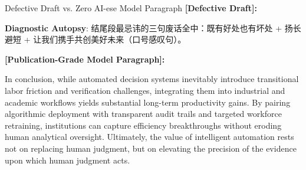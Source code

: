 \begin{ExampleBox}{Defective Draft vs. Zero AI-ese Model Paragraph}
\textbf{\color{TargetHighlight}[Defective Draft]:}\par
{}\par\vspace{4pt}
\textbf{Diagnostic Autopsy}: 结尾段最忌讳的三句废话全中：既有好处也有坏处 + 扬长避短 + 让我们携手共创美好未来（口号感叹句）。\par\vspace{6pt}
\textbf{\color{AcadNavy}[Publication-Grade Model Paragraph]:}\par
In conclusion, while automated decision systems inevitably introduce transitional labor friction and verification challenges, integrating them into industrial and academic workflows yields substantial long-term productivity gains. By pairing algorithmic deployment with transparent audit trails and targeted workforce retraining, institutions can capture efficiency breakthroughs without eroding human analytical oversight. Ultimately, the value of intelligent automation rests not on replacing human judgment, but on elevating the precision of the evidence upon which human judgment acts.
\end{ExampleBox}
